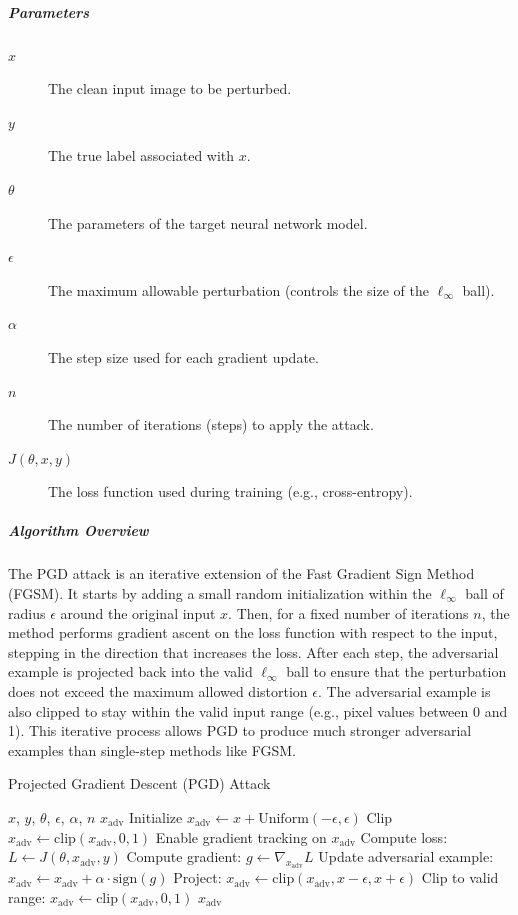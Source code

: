 \documentclass[../main.tex]{subfiles}
\begin{document}
\subparagraph{Parameters}
\begin{description}
  \item[$x$] The clean input image to be perturbed.
  \item[$y$] The true label associated with $x$.
  \item[$\theta$] The parameters of the target neural network model.
  \item[$\epsilon$] The maximum allowable perturbation (controls the size of the $\ell_\infty$ ball).
  \item[$\alpha$] The step size used for each gradient update.
  \item[$n$] The number of iterations (steps) to apply the attack.
  \item[$J(\theta, x, y)$] The loss function used during training (e.g., cross-entropy).
\end{description}
\subparagraph{Algorithm Overview}
The PGD attack is an iterative extension of the Fast Gradient Sign Method (FGSM). It starts by adding a small random initialization within the $\ell_\infty$ ball of radius $\epsilon$ around the original input $x$. Then, for a fixed number of iterations $n$, the method performs gradient ascent on the loss function with respect to the input, stepping in the direction that increases the loss. After each step, the adversarial example is projected back into the valid $\ell_\infty$ ball to ensure that the perturbation does not exceed the maximum allowed distortion $\epsilon$. The adversarial example is also clipped to stay within the valid input range (e.g., pixel values between 0 and 1). This iterative process allows PGD to produce much stronger adversarial examples than single-step methods like FGSM.

\begin{breakablealgorithm}{Projected Gradient Descent (PGD) Attack}
\begin{algorithmic}[1]
\Require $x$, $y$, $\theta$, $\epsilon$, $\alpha$, $n$
\Ensure $x_{\mathrm{adv}}$
\State Initialize $x_{\mathrm{adv}} \gets x + \text{Uniform}(-\epsilon, \epsilon)$
\State Clip $x_{\mathrm{adv}} \gets \mathrm{clip}(x_{\mathrm{adv}}, 0, 1)$
    \State Enable gradient tracking on $x_{\mathrm{adv}}$
    \State Compute loss: $L \gets J(\theta, x_{\mathrm{adv}}, y)$
    \State Compute gradient: $g \gets \nabla_{x_{\mathrm{adv}}} L$
    \State Update adversarial example: $x_{\mathrm{adv}} \gets x_{\mathrm{adv}} + \alpha \cdot \mathrm{sign}(g)$
    \State Project: $x_{\mathrm{adv}} \gets \mathrm{clip}(x_{\mathrm{adv}}, x - \epsilon, x + \epsilon)$
    \State Clip to valid range: $x_{\mathrm{adv}} \gets \mathrm{clip}(x_{\mathrm{adv}}, 0, 1)$
\EndFor
\State \Return $x_{\mathrm{adv}}$
\end{algorithmic}
\end{breakablealgorithm}
\end{document}
